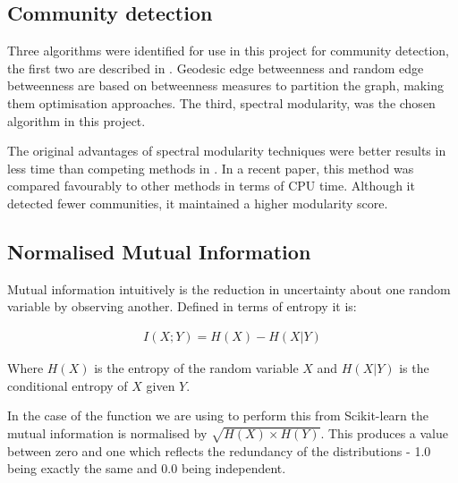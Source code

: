 \subsection{Community detection}

Three algorithms were identified for use in this project for community detection, the first two are described in \textcite{newman_finding_2004}.
Geodesic edge betweenness and random edge betweenness are based on betweenness measures to partition the graph, making them optimisation approaches.
The third, spectral modularity, was the chosen algorithm in this project.

The original advantages of spectral modularity techniques were better results in less time than competing methods in \textcite{newman_modularity_2006}.
In a recent paper, this method was compared favourably to other methods in terms of CPU time\autocite{mcleanunpub}.
Although it detected fewer communities, it maintained a higher modularity score.


\subsection{Normalised Mutual Information}

Mutual information intuitively is the reduction in uncertainty about one random variable by observing another.
Defined in terms of entropy it is\autocite{mackay_information_2003}:

\begin{align}
    I(X;Y) = H(X) - H(X|Y)
\end{align}

Where $H(X)$ is the entropy of the random variable $X$ and $H(X|Y)$ is the conditional entropy of $X$ given $Y$.

In the case of the function we are using to perform this from Scikit-learn the mutual information is normalised by $\sqrt{H(X)\times H(Y)}$\autocite{pedregosa_scikit-learn:_2011}.
This produces a value between zero and one which reflects the redundancy of the distributions - 1.0 being exactly the same and 0.0 being independent.

